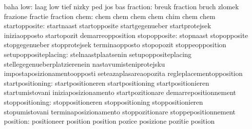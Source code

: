                                   baha
                             low: laag                             low
                                  tief                             nizky
                                  ped                              jos
                                  bas
                        fraction: breuk                            fraction
                                  bruch                            zlomek
                                  frazione                         fractie
                                  fraction
                            chem: chem                             chem
                                  chem                             chem
                                  chim                             chem
                                  chem
                   startopposite: startnaast                       startopposite
                                  startgegenueber                  startprotejsek
                                  iniziaopposto                    startopozit
                                  demarreopposition
                    stopopposite: stopnaast                        stopopposite
                                  stopgegenueber                   stopprotejsek
                                  terminaopposto                   stopopozit
                                  stoppeopposition
            setupoppositeplacing: stelnaastplaatsenin              setupoppositeplacing
                                  stellegegenueberplatzierenein    nastavumisteniprotejsku
                                  impostaposizionamentoopposti     seteazaplasareaopozita
                                  regleplacementopposition
                startpositioning: startpositioneren                startpositioning
                                  startpositionieren               startumistovani
                                  iniziaposizionamento             startpozitionare
                                  demarrepositionnement
                 stoppositioning: stoppositioneren                 stoppositioning
                                  stoppositionieren                stopumistovani
                                  terminaposizionamento            stoppozitionare
                                  stoppepositionnement
                        position: positioneer                      position
                                  position                         pozice
                                  posizione                        pozitie
                                  position
